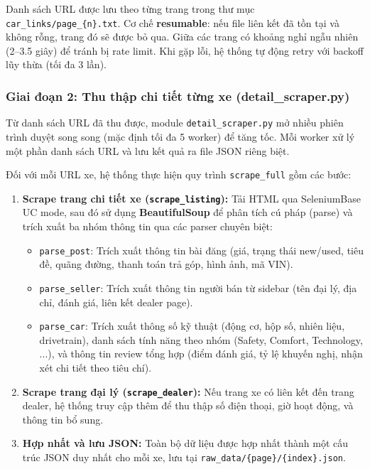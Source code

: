 Danh sách URL được lưu theo từng trang trong thư mục \texttt{car\_links/page\_\{n\}.txt}. Cơ chế \textbf{resumable}: nếu file liên kết đã tồn tại và không rỗng, trang đó sẽ được bỏ qua. Giữa các trang có khoảng nghỉ ngẫu nhiên (2--3.5 giây) để tránh bị rate limit. Khi gặp lỗi, hệ thống tự động retry với backoff lũy thừa (tối đa 3 lần).

\subsubsection{Giai đoạn 2: Thu thập chi tiết từng xe (detail\_scraper.py)}

Từ danh sách URL đã thu được, module \texttt{detail\_scraper.py} mở nhiều phiên trình duyệt song song (mặc định tối đa 5 worker) để tăng tốc. Mỗi worker xử lý một phần danh sách URL và lưu kết quả ra file JSON riêng biệt.

Đối với mỗi URL xe, hệ thống thực hiện quy trình \texttt{scrape\_full} gồm các bước:
\begin{enumerate}
    \item \textbf{Scrape trang chi tiết xe (\texttt{scrape\_listing}):} Tải HTML qua SeleniumBase UC mode, sau đó sử dụng \textbf{BeautifulSoup} để phân tích cú pháp (parse) và trích xuất ba nhóm thông tin qua các parser chuyên biệt:
    \begin{itemize}
        \item \texttt{parse\_post}: Trích xuất thông tin bài đăng (giá, trạng thái new/used, tiêu đề, quãng đường, thanh toán trả góp, hình ảnh, mã VIN).
        \item \texttt{parse\_seller}: Trích xuất thông tin người bán từ sidebar (tên đại lý, địa chỉ, đánh giá, liên kết dealer page).
        \item \texttt{parse\_car}: Trích xuất thông số kỹ thuật (động cơ, hộp số, nhiên liệu, drivetrain), danh sách tính năng theo nhóm (Safety, Comfort, Technology, ...), và thông tin review tổng hợp (điểm đánh giá, tỷ lệ khuyến nghị, nhận xét chi tiết theo tiêu chí).
    \end{itemize}
    \item \textbf{Scrape trang đại lý (\texttt{scrape\_dealer}):} Nếu trang xe có liên kết đến trang dealer, hệ thống truy cập thêm để thu thập số điện thoại, giờ hoạt động, và thông tin bổ sung.
    \item \textbf{Hợp nhất và lưu JSON:} Toàn bộ dữ liệu được hợp nhất thành một cấu trúc JSON duy nhất cho mỗi xe, lưu tại \texttt{raw\_data/\{page\}/\{index\}.json}.
\end{enumerate}


